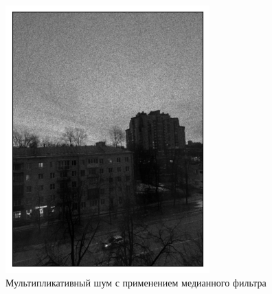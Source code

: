 \documentclass[a4paper,12pt]{article}
\begin{document}
\begin{figure}[H]
\begin{minipage}{0.49\textwidth}
                \centering \includegraphics[width=\textwidth]{results/nlf_speckle_1.png}
                \caption{Мультипликативный шум с применением медианного фильтра}
            \end{minipage}
        \end{figure}
\end{document}
